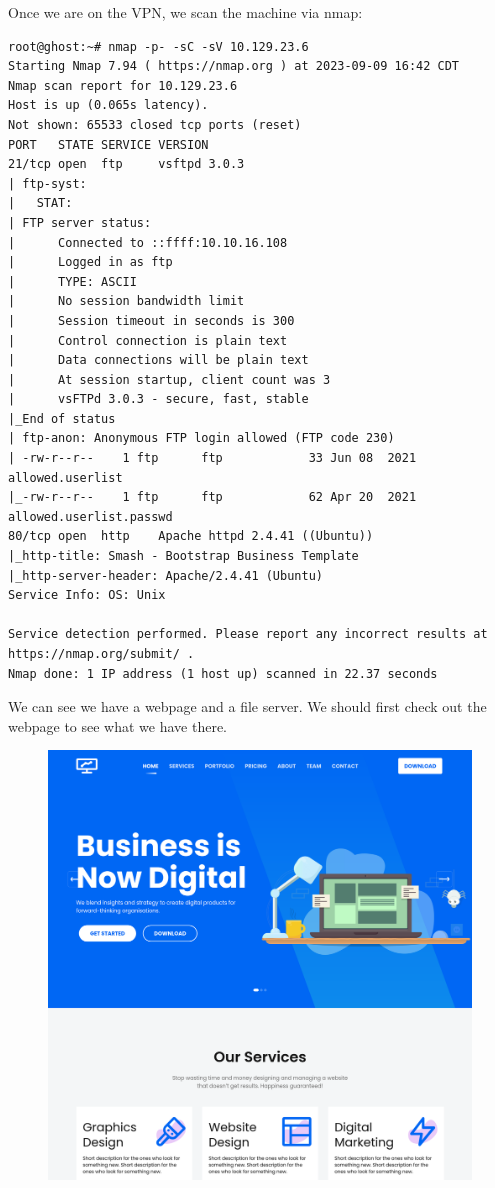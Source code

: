 \documentclass[conference]{IEEEtran}
\begin{document}
Once we are on the VPN, we scan the machine via nmap:
\begin{scriptsize}
\begin{verbatim}
root@ghost:~# nmap -p- -sC -sV 10.129.23.6
Starting Nmap 7.94 ( https://nmap.org ) at 2023-09-09 16:42 CDT
Nmap scan report for 10.129.23.6
Host is up (0.065s latency).
Not shown: 65533 closed tcp ports (reset)
PORT   STATE SERVICE VERSION
21/tcp open  ftp     vsftpd 3.0.3
| ftp-syst:
|   STAT:
| FTP server status:
|      Connected to ::ffff:10.10.16.108
|      Logged in as ftp
|      TYPE: ASCII
|      No session bandwidth limit
|      Session timeout in seconds is 300
|      Control connection is plain text
|      Data connections will be plain text
|      At session startup, client count was 3
|      vsFTPd 3.0.3 - secure, fast, stable
|_End of status
| ftp-anon: Anonymous FTP login allowed (FTP code 230)
| -rw-r--r--    1 ftp      ftp            33 Jun 08  2021 allowed.userlist
|_-rw-r--r--    1 ftp      ftp            62 Apr 20  2021 allowed.userlist.passwd
80/tcp open  http    Apache httpd 2.4.41 ((Ubuntu))
|_http-title: Smash - Bootstrap Business Template
|_http-server-header: Apache/2.4.41 (Ubuntu)
Service Info: OS: Unix

Service detection performed. Please report any incorrect results at https://nmap.org/submit/ .
Nmap done: 1 IP address (1 host up) scanned in 22.37 seconds
\end{verbatim}
\end{scriptsize}

We can see we have a webpage and a file server. We should first check out the webpage to see what we have there.



\begin{figure}[htb]
\includegraphics[scale=0.075]{business_digital.png}
\centering
\end{figure}
\end{document}
